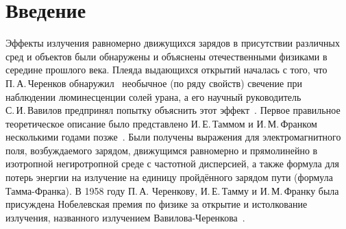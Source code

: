 \chapter*{Введение}							%

\newcommand{\actuality}{}
\newcommand{\progress}{}
\newcommand{\aim}{{\textbf\aimTXT}}
\newcommand{\tasks}{\textbf{\tasksTXT}}
\newcommand{\novelty}{\textbf{\noveltyTXT}}
\newcommand{\influence}{\textbf{\influenceTXT}}
\newcommand{\methods}{\textbf{\methodsTXT}}
\newcommand{\defpositions}{\textbf{\defpositionsTXT}}
\newcommand{\reliability}{\textbf{\reliabilityTXT}}
\newcommand{\probation}{\textbf{\probationTXT}}
\newcommand{\contribution}{\textbf{\contributionTXT}}
\newcommand{\publications}{\textbf{\publicationsTXT}}



Эффекты излучения равномерно движущихся зарядов в присутствии различных сред и объектов были обнаружены и объяснены отечественными физиками в середине прошлого века. Плеяда выдающихся открытий началась с того, что П. А. Черенков обнаружил~\cite{Cherenkov34} необычное (по ряду свойств) свечение при наблюдении люминесценции солей урана, а его научный руководитель С. И. Вавилов предпринял попытку объяснить этот эффект~\cite{Vavilov34}. Первое правильное теоретическое описание было представлено И. Е. Таммом и И. М. Франком несколькими годами позже~\cite{TammFrank37}. Были получены выражения для электромагнитного поля, возбуждаемого зарядом, движущимся равномерно и прямолинейно в изотропной негиротропной среде с частотной дисперсией, а также формула для потерь энергии на излучение на единицу пройдённого зарядом пути (формула Тамма-Франка). В 1958 году П. А. Черенкову, И. Е. Тамму и И. М. Франку была присуждена Нобелевская премия по физике за открытие и истолкование излучения, названного излучением Вавилова-Черенкова~\cite{Cherenkov1959, Tamm1959, Frank1959}.

